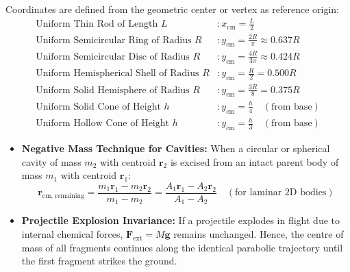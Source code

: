 \documentclass[10pt,twoside,openright]{book}
\begin{document}
\begin{formulabox}
Coordinates are defined from the geometric center or vertex as reference origin:
\begin{align}
  \text{Uniform Thin Rod of Length } L &: x_{\text{cm}} = \frac{L}{2} \\
  \text{Uniform Semicircular Ring of Radius } R &: y_{\text{cm}} = \frac{2R}{\pi} \approx 0.637 R \\
  \text{Uniform Semicircular Disc of Radius } R &: y_{\text{cm}} = \frac{4R}{3\pi} \approx 0.424 R \\
  \text{Uniform Hemispherical Shell of Radius } R &: y_{\text{cm}} = \frac{R}{2} = 0.500 R \\
  \text{Uniform Solid Hemisphere of Radius } R &: y_{\text{cm}} = \frac{3R}{8} = 0.375 R \\
  \text{Uniform Solid Cone of Height } h &: y_{\text{cm}} = \frac{h}{4} \quad (\text{from base}) \\
  \text{Uniform Hollow Cone of Height } h &: y_{\text{cm}} = \frac{h}{3} \quad (\text{from base})
\end{align}
\end{formulabox}

\begin{usecasebox}
\begin{itemize}
  \item \textbf{Negative Mass Technique for Cavities:} When a circular or spherical cavity of mass $m_2$ with centroid $\mathbf{r}_2$ is excised from an intact parent body of mass $m_1$ with centroid $\mathbf{r}_1$:
  \begin{equation}
    \mathbf{r}_{\text{cm, remaining}} = \frac{m_1 \mathbf{r}_1 - m_2 \mathbf{r}_2}{m_1 - m_2} = \frac{A_1 \mathbf{r}_1 - A_2 \mathbf{r}_2}{A_1 - A_2} \quad (\text{for laminar 2D bodies})
  \end{equation}
  \item \textbf{Projectile Explosion Invariance:} If a projectile explodes in flight due to internal chemical forces, $\mathbf{F}_{\text{ext}} = M\mathbf{g}$ remains unchanged. Hence, the centre of mass of all fragments continues along the identical parabolic trajectory until the first fragment strikes the ground.
\end{itemize}
\end{usecasebox}
\end{document}
